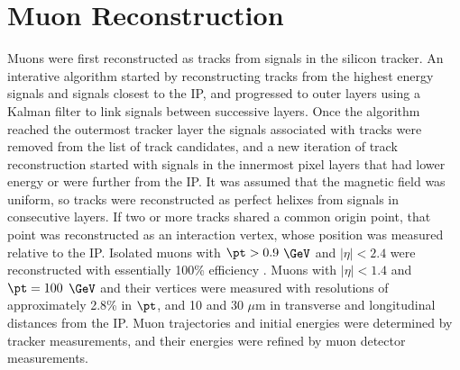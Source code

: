


\section{Muon Reconstruction}
\label{sec:muReco}

Muons were first reconstructed as tracks from signals in the silicon tracker.  An interative algorithm started 
by reconstructing tracks from the highest energy signals and signals closest to the IP, and progressed to outer layers 
using a Kalman filter to link signals between successive layers.  Once the algorithm reached the outermost tracker 
layer the signals associated with tracks were removed from the list of track candidates, and a new iteration of track 
reconstruction started with signals in the innermost pixel layers that had lower energy or were further 
from the IP.  It was assumed that the magnetic field was uniform, so tracks were reconstructed as perfect helixes 
from signals in consecutive layers.  If two or more tracks shared a common origin point, that point was reconstructed 
as an interaction vertex, whose position was measured relative to the IP.  Isolated muons with 
$\pt > 0.9$ $\GeV$ and $|\eta| < 2.4$ were reconstructed with essentially 100\% efficiency \cite{trackerPerformanceInCollisions}.  
Muons with $|\eta| < 1.4$ and $\pt = 100$ $\GeV$ and their vertices were measured with resolutions of approximately 
2.8\% in $\pt$, and 10 and 30 $\mu$m in transverse and longitudinal distances from the IP.  Muon trajectories and 
initial energies were determined by tracker measurements, and their energies were refined by muon detector measurements.

